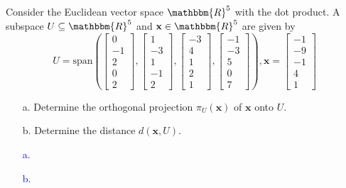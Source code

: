 \documentclass[a4paper,12pt]{article}
\newcommand{\R}{\mathbbm{R}}
\newcommand{\M}[1]{ \begin{bmatrix} #1 \end{bmatrix} }
\newcommand{\vecx}{\textbf{x}}
\begin{document}
\subsection{}
Consider the Euclidean vector space $\R^5$ with the dot product. A subspace $U \subseteq \R^5$ and $\vecx \in \R^5$ are given by
$$U = \textrm{span} \left( \M{0\\-1\\2\\0\\2},
                                         \M{1\\-3\\1\\-1\\2},
                                         \M{-3\\4\\1\\2\\1},
                                         \M{-1\\-3\\5\\0\\7}
                                 \right), \vecx =
                                         \M{-1\\-9\\-1\\4\\1}$$
\begin{itemize}
 \item [a.] Determine the orthogonal projection $\pi_U(\vecx)$ of $\vecx$ onto $U$.
 \item [b.] Determine the distance $d(\vecx,U)$.
\end{itemize}
\textcolor{blue}{
\begin{itemize}
 \item [a.]
 \item [b.]
\end{itemize}
}
\end{document}
